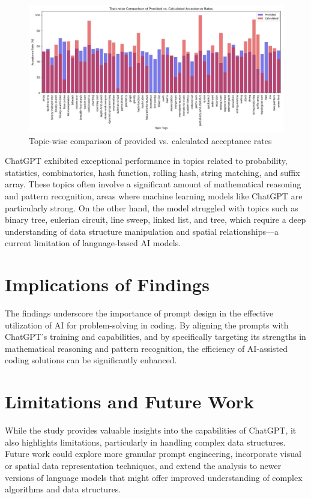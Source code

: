 \begin{figure}[H]
    \centering
    \includegraphics[width=1\textwidth]{figures/acceptance_topic_wise.jpg}
    \caption{Topic-wise comparison of provided vs. calculated acceptance rates}
    \label{fig:topic_wise_acceptance}
\end{figure}

ChatGPT exhibited exceptional performance in topics related to probability, statistics, combinatorics, hash function, rolling hash, string matching, and suffix array. These topics often involve a significant amount of mathematical reasoning and pattern recognition, areas where machine learning models like ChatGPT are particularly strong. On the other hand, the model struggled with topics such as binary tree, eulerian circuit, line sweep, linked list, and tree, which require a deep understanding of data structure manipulation and spatial relationships—a current limitation of language-based AI models.

\section{Implications of Findings}
The findings underscore the importance of prompt design in the effective utilization of AI for problem-solving in coding. By aligning the prompts with ChatGPT's training and capabilities, and by specifically targeting its strengths in mathematical reasoning and pattern recognition, the efficiency of AI-assisted coding solutions can be significantly enhanced.

\section{Limitations and Future Work}
While the study provides valuable insights into the capabilities of ChatGPT, it also highlights limitations, particularly in handling complex data structures. Future work could explore more granular prompt engineering, incorporate visual or spatial data representation techniques, and extend the analysis to newer versions of language models that might offer improved understanding of complex algorithms and data structures.

